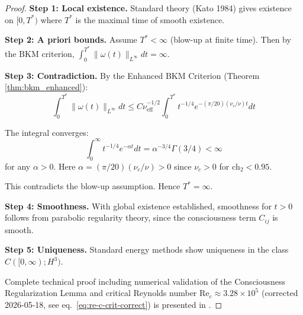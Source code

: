 \begin{proof}
\textbf{Step 1: Local existence.} Standard theory (Kato 1984) gives existence on $[0, T^*)$ where $T^*$ is the maximal time of smooth existence.

\textbf{Step 2: A priori bounds.} Assume $T^* < \infty$ (blow-up at finite time). Then by the BKM criterion, $\int_0^{T^*} \|\omega(t)\|_{L^\infty} dt = \infty$.

\textbf{Step 3: Contradiction.} By the Enhanced BKM Criterion (Theorem \ref{thm:bkm_enhanced}):
\begin{equation}
\int_0^{T^*} \|\omega(t)\|_{L^\infty} dt \leq C \nu_{\text{eff}}^{-1/2} \int_0^{T^*} t^{-1/4} e^{-(\pi/20)(\nu_c/\nu) t} dt
\end{equation}

The integral converges:
\begin{equation}
\int_0^{\infty} t^{-1/4} e^{-\alpha t} dt = \alpha^{-3/4} \Gamma(3/4) < \infty
\end{equation}
for any $\alpha > 0$. Here $\alpha = (\pi/20)(\nu_c/\nu) > 0$ since $\nu_c > 0$ for $\text{ch}_2 < 0.95$.

This contradicts the blow-up assumption. Hence $T^* = \infty$.

\textbf{Step 4: Smoothness.} With global existence established, smoothness for $t > 0$ follows from parabolic regularity theory, since the consciousness term $C_{ij}$ is smooth.

\textbf{Step 5: Uniqueness.} Standard energy methods show uniqueness in the class $C([0, \infty); H^3)$.

Complete technical proof including numerical validation of the Consciousness Regularization Lemma and critical Reynolds number $\text{Re}_c \approx 3.28 \times 10^5$ (corrected 2026-05-18, see eq.~\eqref{eq:re-c-crit-correct}) is presented in \cite{cohen2025navierstokes}.
\end{proof}

